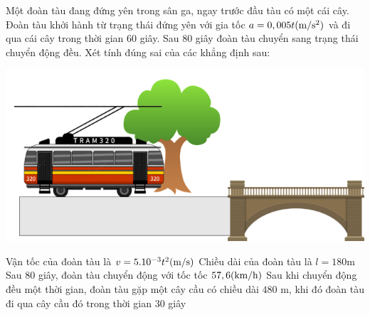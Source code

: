 \begin{ex}%
Một đoàn tàu đang đứng yên trong sân ga, ngay trước đầu tàu có một cái cây. Đoàn tàu khởi hành từ trạng thái đứng yên với gia tốc $ a=0,005t\text(\text{m/}{\text{s}^{\text{2}}})$ và đi qua cái cây trong thời gian $60$ giây. Sau $80$ giây đoàn tàu chuyển sang trạng thái chuyển động đều. Xét tính đúng sai của các khẳng định sau:\\
\centerline{\includegraphics[width=.6\textwidth]{images/4.15}}
\choiceTF
{Vận tốc của đoàn tàu là $v=5.10^{-3}{t^2}\text(\text{m/s})$}
{\True Chiều dài của đoàn tàu là $l=180$m}
{\True Sau $80$ giây, đoàn tàu chuyển động với tốc tốc $57,6\text(\text{km/h})$}
{Sau khi chuyển động đều một thời gian, đoàn tàu gặp một cây cầu có chiều dài $480$ m, khi đó đoàn tàu đi qua cây cầu đó trong thời gian $30$ giây}
\end{ex}

